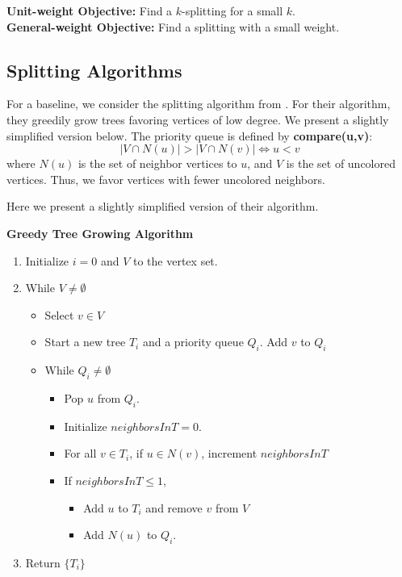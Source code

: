 \documentclass{article} %
\begin{document}
\noindent\textbf{Unit-weight Objective:} Find a $k$-splitting for a small $k$.\\
\noindent\textbf{General-weight Objective:} Find a splitting with a small weight.

\subsection{Splitting Algorithms}%
For a baseline, we consider the splitting algorithm from \cite{rivasseau2005jungle}. For their algorithm, they greedily grow trees favoring vertices of low degree. We present a slightly simplified version below. The priority queue is defined by
\noindent\textbf{compare(u,v)}: 
\[
|V\cap N(u)|>|V\cap N(v)| \iff u<v
\]
where $N(u)$ is the set of neighbor vertices to $u$, and $V$ is the set of uncolored vertices. Thus, we favor vertices with fewer uncolored neighbors.

\noindent Here we present a slightly simplified version of their algorithm.\\

\begin{framed}
\noindent\textbf{Greedy Tree Growing Algorithm \cite{rivasseau2005jungle}}
\begin{enumerate}
\item Initialize $i=0$ and $V$ to the vertex set.
\item While $V\neq\emptyset$
\begin{itemize}
\item Select $v\in V$
\item Start a new tree $T_i$ and a priority queue $Q_i$. Add $v$ to $Q_i$
\item While $Q_i\neq\emptyset$
\begin{itemize}
\item Pop $u$ from $Q_i$.
\item Initialize $neighborsInT=0$.
\item For all $v\in T_i$, if $u\in N(v)$, increment $neighborsInT$
\item If $neighborsInT\le1$,
\begin{itemize}
\item Add $u$ to $T_i$ and remove $v$ from $V$
\item Add $N(u)$ to $Q_i$.
\end{itemize}
\end{itemize}
\end{itemize}
\item Return $\{T_i\}$
\end{enumerate}
\end{framed}
\end{document}
